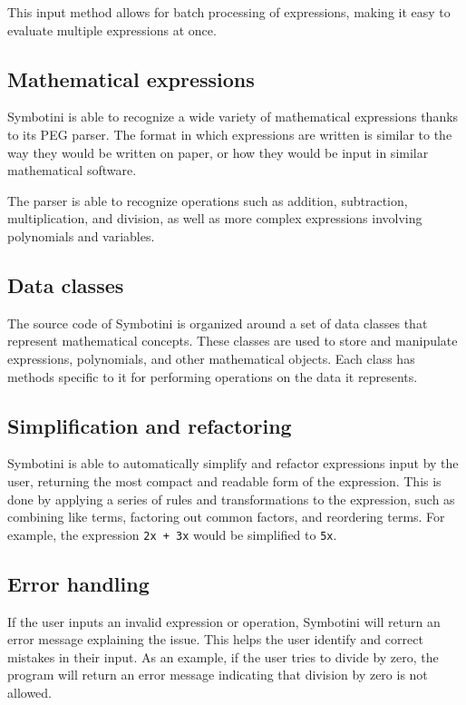 This input method allows for batch processing of expressions, making it easy to evaluate multiple expressions at once.

\subsection{Mathematical expressions}\label{subsec:mathematical-expressions}

Symbotini is able to recognize a wide variety of mathematical expressions thanks to its PEG parser. The format in which expressions are written is similar to the way they would be written on paper, or how they would be input in similar mathematical software.

The parser is able to recognize operations such as addition, subtraction, multiplication, and division, as well as more complex expressions involving polynomials and variables.

\subsection{Data classes}\label{subsec:data-classes}

The source code of Symbotini is organized around a set of data classes that represent mathematical concepts. These classes are used to store and manipulate expressions, polynomials, and other mathematical objects. Each class has methods specific to it for performing operations on the data it represents.

\subsection{Simplification and refactoring}\label{subsec:simplification-refactoring}

Symbotini is able to automatically simplify and refactor expressions input by the user, returning the most compact and readable form of the expression. This is done by applying a series of rules and transformations to the expression, such as combining like terms, factoring out common factors, and reordering terms. For example, the expression \verb|2x + 3x| would be simplified to \verb|5x|.

\subsection{Error handling}\label{subsec:error-handling}

If the user inputs an invalid expression or operation, Symbotini will return an error message explaining the issue. This helps the user identify and correct mistakes in their input. As an example, if the user tries to divide by zero, the program will return an error message indicating that division by zero is not allowed.

